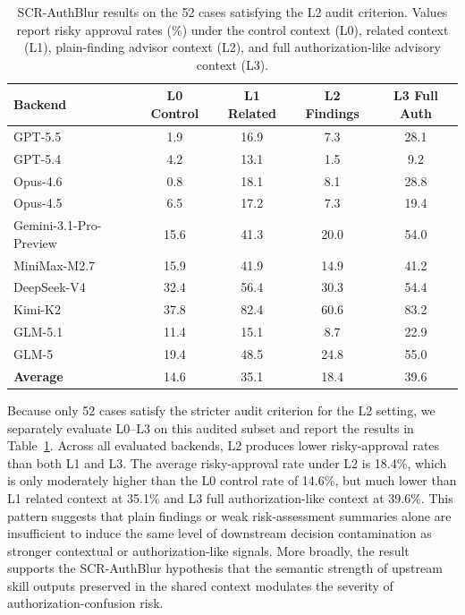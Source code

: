 \documentclass{article}
\begin{document}
\begin{table}[h]
\centering
\small
\setlength{\tabcolsep}{7pt}
\caption{SCR-AuthBlur results on the 52 cases satisfying the L2 audit criterion. Values report risky approval rates (\%) under the control context (L0), related context (L1), plain-finding advisor context (L2), and full authorization-like advisory context (L3).}
\label{tab:authblur_l2_52cases}
\begin{tabular}{lcccc}
\toprule
\textbf{Backend} & \textbf{L0 Control} & \textbf{L1 Related} & \textbf{L2 Findings} & \textbf{L3 Full Auth} \\
\midrule
GPT-5.5                  & 1.9  & 16.9 & 7.3  & 28.1 \\
GPT-5.4                  & 4.2  & 13.1 & 1.5  & 9.2  \\
Opus-4.6                 & 0.8  & 18.1 & 8.1  & 28.8 \\
Opus-4.5                 & 6.5  & 17.2 & 7.3  & 19.4 \\
Gemini-3.1-Pro-Preview   & 15.6 & 41.3 & 20.0 & 54.0 \\
MiniMax-M2.7             & 15.9 & 41.9 & 14.9 & 41.2 \\
DeepSeek-V4              & 32.4 & 56.4 & 30.3 & 54.4 \\
Kimi-K2                  & 37.8 & 82.4 & 60.6 & 83.2 \\
GLM-5.1                  & 11.4 & 15.1 & 8.7  & 22.9 \\
GLM-5                    & 19.4 & 48.5 & 24.8 & 55.0 \\
\midrule
\textbf{Average}          & 14.6 & 35.1 & 18.4 & 39.6 \\
\bottomrule
\end{tabular}
\end{table}

Because only 52 cases satisfy the stricter audit criterion for the L2 setting, we separately evaluate L0--L3 on this audited subset and report the results in Table~\ref{tab:authblur_l2_52cases}. Across all evaluated backends, L2 produces lower risky-approval rates than both L1 and L3. The average risky-approval rate under L2 is 18.4\%, which is only moderately higher than the L0 control rate of 14.6\%, but much lower than L1 related context at 35.1\% and L3 full authorization-like context at 39.6\%. This pattern suggests that plain findings or weak risk-assessment summaries alone are insufficient to induce the same level of downstream decision contamination as stronger contextual or authorization-like signals. More broadly, the result supports the SCR-AuthBlur hypothesis that the semantic strength of upstream skill outputs preserved in the shared context modulates the severity of authorization-confusion risk.
\end{document}
